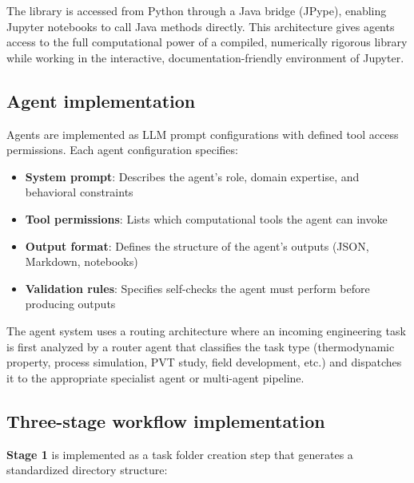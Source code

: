 \documentclass[review,3p]{elsarticle}
\begin{document}
The library is accessed from Python through a Java bridge (JPype), enabling Jupyter notebooks to call Java methods directly. This architecture gives agents access to the full computational power of a compiled, numerically rigorous library while working in the interactive, documentation-friendly environment of Jupyter.

\subsection{Agent implementation}

Agents are implemented as LLM prompt configurations with defined tool access permissions. Each agent configuration specifies:

\begin{itemize}
  \item \textbf{System prompt}: Describes the agent's role, domain expertise, and behavioral constraints
  \item \textbf{Tool permissions}: Lists which computational tools the agent can invoke
  \item \textbf{Output format}: Defines the structure of the agent's outputs (JSON, Markdown, notebooks)
  \item \textbf{Validation rules}: Specifies self-checks the agent must perform before producing outputs
\end{itemize}

The agent system uses a routing architecture where an incoming engineering task is first analyzed by a router agent that classifies the task type (thermodynamic property, process simulation, PVT study, field development, etc.) and dispatches it to the appropriate specialist agent or multi-agent pipeline.

\subsection{Three-stage workflow implementation}

\textbf{Stage 1} is implemented as a task folder creation step that generates a standardized directory structure:
\end{document}
